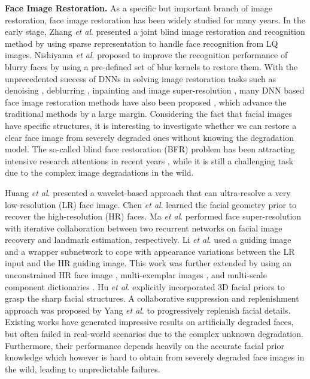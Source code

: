 \documentclass[final]{cvpr}
\begin{document}
\textbf{Face Image Restoration.}
As a specific but important branch of image restoration, face image restoration has been widely studied for many years. In the early stage, Zhang \emph{et al}. \cite{Zhang2011Sparseprior} presented a joint blind image restoration and recognition method by using sparse representation to handle face recognition from LQ images. Nishiyama \emph{et al}. \cite{Nishiyama2009Face} proposed to improve the recognition performance of blurry faces by using a pre-defined set of blur kernels to restore them. With the unprecedented success of DNNs in solving image restoration tasks such as denoising \cite{Guo2019CBDNet}, deblurring \cite{Kupyn2017DeblurGAN,Shen2018Deblur}, inpainting \cite{Yu2018Deepfill,Liu2018Partialconv} and image super-resolution \cite{Ledig2017SRGAN,Lim2017EDSR}, many DNN based face image restoration methods have also been proposed \cite{Chen2018FSRNet,Kim2019PFSR,Ma2020FSR}, which advance the traditional methods by a large margin. Considering the fact that facial images have specific structures, it is interesting to investigate whether we can restore a clear face image from severely degraded ones without knowing the degradation model. The so-called blind face restoration (BFR) problem has been attracting intensive research attentions in recent years \cite{Li2018GFRNet,Dogan2019Exemplar,Li2020Restore,Yang2020HiFaceGANFR}, while it is still a challenging task due to the complex image degradations in the wild.

Huang \emph{et al}. \cite{Huang2017Wavelet} presented a wavelet-based approach that can ultra-resolve a very low-resolution (LR) face image. Chen \emph{et al}. \cite{Chen2018FSRNet} learned the facial geometry prior to recover the high-resolution (HR) faces. Ma \emph{et al}. \cite{Ma2020FSR} performed face super-resolution with iterative collaboration between two recurrent networks on facial image recovery and landmark estimation, respectively. Li \emph{et al}. \cite{Li2018GFRNet} used a guiding image and a wrapper subnetwork to cope with appearance variations between the LR input and the HR guiding image. This work was further extended by using an unconstrained HR face image \cite{Dogan2019Exemplar}, multi-exemplar images \cite{Li2020ASFFNet}, and multi-scale component dictionaries \cite{Li2020Restore}. Hu \emph{et al}. \cite{Hu20203dprior} explicitly incorporated 3D facial priors to grasp the sharp facial structures. A collaborative suppression and replenishment approach was proposed by Yang \emph{et al}. \cite{Yang2020HiFaceGANFR} to progressively replenish facial details. Existing works have generated impressive results on artificially degraded faces, but often failed in real-world scenarios due to the complex unknown degradation. Furthermore, their performance depends heavily on the accurate facial prior knowledge which however is hard to obtain from severely degraded face images in the wild, leading to unpredictable failures.
\end{document}
